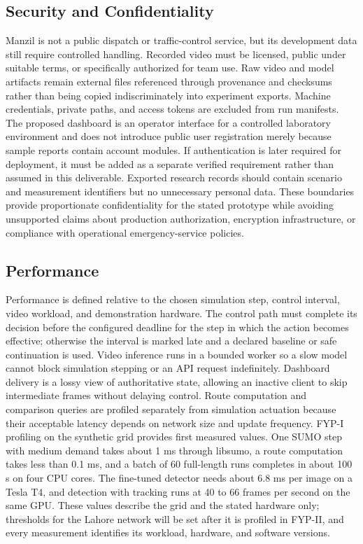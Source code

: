 \subsection{Security and Confidentiality}

Manzil is not a public dispatch or traffic-control service, but its development data still require controlled handling. Recorded video must be licensed, public under suitable terms, or specifically authorized for team use. Raw video and model artifacts remain external files referenced through provenance and checksums rather than being copied indiscriminately into experiment exports. Machine credentials, private paths, and access tokens are excluded from run manifests. The proposed dashboard is an operator interface for a controlled laboratory environment and does not introduce public user registration merely because sample reports contain account modules. If authentication is later required for deployment, it must be added as a separate verified requirement rather than assumed in this deliverable. Exported research records should contain scenario and measurement identifiers but no unnecessary personal data. These boundaries provide proportionate confidentiality for the stated prototype while avoiding unsupported claims about production authorization, encryption infrastructure, or compliance with operational emergency-service policies.

\subsection{Performance}

Performance is defined relative to the chosen simulation step, control interval, video workload, and demonstration hardware. The control path must complete its decision before the configured deadline for the step in which the action becomes effective; otherwise the interval is marked late and a declared baseline or safe continuation is used. Video inference runs in a bounded worker so a slow model cannot block simulation stepping or an API request indefinitely. Dashboard delivery is a lossy view of authoritative state, allowing an inactive client to skip intermediate frames without delaying control. Route computation and comparison queries are profiled separately from simulation actuation because their acceptable latency depends on network size and update frequency. FYP-I profiling on the synthetic grid provides first measured values. One SUMO step with medium demand takes about 1 ms through libsumo, a route computation takes less than 0.1 ms, and a batch of 60 full-length runs completes in about 100 s on four CPU cores. The fine-tuned detector needs about 6.8 ms per image on a Tesla T4, and detection with tracking runs at 40 to 66 frames per second on the same GPU. These values describe the grid and the stated hardware only; thresholds for the Lahore network will be set after it is profiled in FYP-II, and every measurement identifies its workload, hardware, and software versions.

